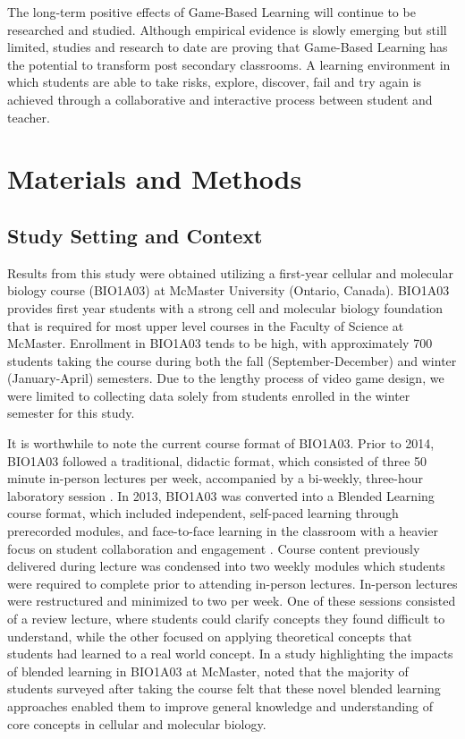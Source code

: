 \documentclass{article}
\begin{document}
The long-term positive effects of Game-Based Learning will continue to be researched and studied. Although empirical evidence is slowly emerging but still limited, studies and research to date are proving that Game-Based Learning has the potential to transform post secondary classrooms. A learning environment in which students are able to take risks, explore, discover, fail and try again is achieved through a collaborative and interactive process between student and teacher.

\section{Materials and Methods}

\subsection{Study Setting and Context}

Results from this study were obtained utilizing a first-year cellular and molecular biology course (BIO1A03) at McMaster University (Ontario, Canada). BIO1A03 provides first year students with a strong cell and molecular biology foundation that is required for most upper level courses in the Faculty of Science at McMaster. Enrollment in BIO1A03 tends to be high, with approximately 700 students taking the course during both the fall (September-December) and winter (January-April) semesters. Due to the lengthy process of video game design, we were limited to collecting data solely from students enrolled in the winter semester for this study.

It is worthwhile to note the current course format of BIO1A03. Prior to 2014, BIO1A03 followed a traditional, didactic format, which consisted of three 50 minute in-person lectures per week, accompanied by a bi-weekly, three-hour laboratory session \citep{tahir2022blended}. In 2013, BIO1A03 was converted into a Blended Learning course format, which included independent, self-paced learning through prerecorded modules, and face-to-face learning in the classroom with a heavier focus on student collaboration and engagement \citep{tahir2022blended}. Course content previously delivered during lecture was condensed into two weekly modules which students were required to complete prior to attending in-person lectures. In-person lectures were restructured and minimized to two per week. One of these sessions consisted of a review lecture, where students could clarify concepts they found difficult to understand, while the other focused on applying theoretical concepts that students had learned to a real world concept. In a study highlighting the impacts of blended learning in BIO1A03 at McMaster, \citet{tahir2022blended} noted that the majority of students surveyed after taking the course felt that these novel blended learning approaches enabled them to improve general knowledge and understanding of core concepts in cellular and molecular biology.
\end{document}
